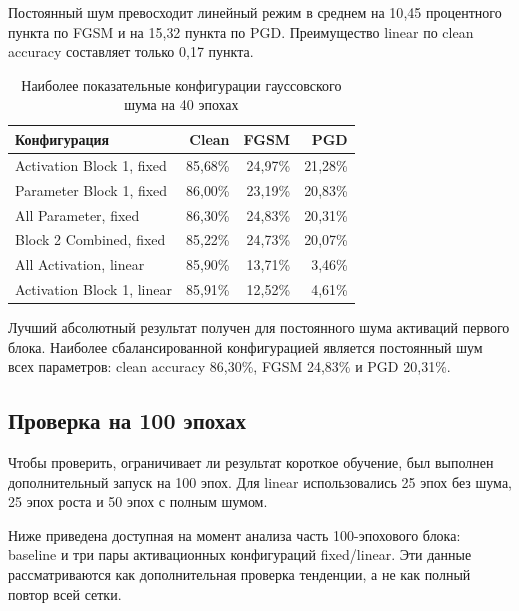 \documentclass[a4paper]{article}
\begin{document}
Постоянный шум превосходит линейный режим в среднем на 10{,}45 процентного пункта по FGSM и на 15{,}32 пункта по PGD. Преимущество linear по clean accuracy составляет только 0{,}17 пункта.

\begin{table}[H]
\centering
\small
\begin{tabular}{p{5.2cm}rrr}
\toprule
Конфигурация & Clean & FGSM & PGD\\
\midrule
Activation Block 1, fixed & 85{,}68\% & 24{,}97\% & 21{,}28\%\\
Parameter Block 1, fixed & 86{,}00\% & 23{,}19\% & 20{,}83\%\\
All Parameter, fixed & 86{,}30\% & 24{,}83\% & 20{,}31\%\\
Block 2 Combined, fixed & 85{,}22\% & 24{,}73\% & 20{,}07\%\\
All Activation, linear & 85{,}90\% & 13{,}71\% & 3{,}46\%\\
Activation Block 1, linear & 85{,}91\% & 12{,}52\% & 4{,}61\%\\
\bottomrule
\end{tabular}
\caption{Наиболее показательные конфигурации гауссовского шума на 40 эпохах}
\label{tab:gaussian-best}
\end{table}

Лучший абсолютный результат получен для постоянного шума активаций первого блока. Наиболее сбалансированной конфигурацией является постоянный шум всех параметров: clean accuracy 86{,}30\%, FGSM 24{,}83\% и PGD 20{,}31\%.

\subsection{Проверка на 100 эпохах}

Чтобы проверить, ограничивает ли результат короткое обучение, был выполнен дополнительный запуск на 100 эпох. Для linear использовались 25 эпох без шума, 25 эпох роста и 50 эпох с полным шумом.

Ниже приведена доступная на момент анализа часть 100-эпохового блока: baseline и три пары активационных конфигураций fixed/linear. Эти данные рассматриваются как дополнительная проверка тенденции, а не как полный повтор всей сетки.
\end{document}
